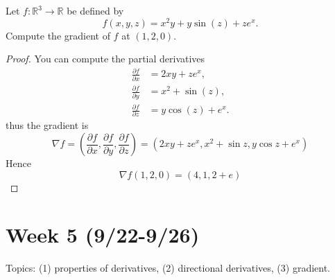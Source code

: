 \documentclass[openany]{book}
\begin{document}







\begin{prob}
    Let \( f : \mathbb{R}^3 \to \mathbb{R} \) be defined by  
\[
f(x, y, z) = x^2 y + y \sin(z) + z e^x.
\]  
Compute the gradient of $f$ at $(1,2,0)$.
\end{prob}
\begin{proof}
    You can compute the partial derivatives 
    \begin{align*}
        \frac{\partial f}{\partial x} &= 2xy + ze^x, \\
        \frac{\partial f}{\partial y} &= x^2 + \sin(z), \\
        \frac{\partial f}{\partial z} &= y \cos(z) + e^x.
        \end{align*}
    thus the gradient is 
    \[
\nabla f = \left( \frac{\partial f}{\partial x}, \frac{\partial f}{\partial y}, \frac{\partial f}{\partial z} \right)=(2xy+ze^x, x^2+\sin z, y\cos z+e^x)
\]
Hence 
\begin{equation*}
    \nabla f(1,2,0)=(4, 1, 2+e)
\end{equation*}

\end{proof}


\newpage
\section*{\centering Week 5 (9/22-9/26)}

\renewcommand\thesection{\arabic{section}}

\noindent
Topics: (1) properties of derivatives, (2) directional derivatives, (3) gradient.



 
\end{document}
